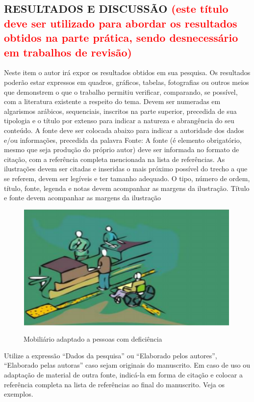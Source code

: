 \documentclass[12pt]{article}
\begin{document}
\subsection{RESULTADOS E DISCUSSÃO \textcolor{red}{(este título deve ser utilizado para abordar os resultados obtidos na parte prática, sendo desnecessário em trabalhos de revisão)}}

Neste item o autor irá expor os resultados obtidos em sua pesquisa. Os resultados poderão estar expressos em quadros, gráficos, tabelas, fotografias ou outros meios que demonstrem o que o trabalho permitiu verificar, comparando, se possível, com a literatura existente a respeito do tema. 
Devem ser numeradas em algarismos arábicos, sequenciais, inscritos na parte superior, precedida de sua tipologia e o título por extenso para indicar a natureza e abrangência do seu conteúdo. A fonte deve ser colocada abaixo para indicar a autoridade dos dados e/ou informações, precedida da palavra Fonte: A fonte (é elemento obrigatório, mesmo que seja produção do próprio autor) deve ser informada no formato de citação, com a referência completa mencionada na lista de referências.
As ilustrações devem ser citadas e inseridas o mais próximo possível do trecho a que se referem, devem ser legíveis e ter tamanho adequado. O tipo, número de ordem, título, fonte, legenda e notas devem acompanhar as margens da ilustração. Título e fonte devem acompanhar as margens da ilustração

\begin{figure}[H]
\centering
\caption{Mobiliário adaptado a pessoas com deficiência}
\includegraphics[width=.5\textwidth]{Fig/pupo.PNG}
{\footnotesize{}} %
\label{fig1}
\end{figure}


Utilize a expressão “Dados da pesquisa” ou “Elaborado pelos autores”, “Elaborado pelas autoras” caso sejam originais do manuscrito. Em caso de uso ou adaptação de material de outra fonte, indicá-la em forma de citação e colocar a referência completa na lista de referências ao final do manuscrito. Veja os exemplos.
\end{document}
